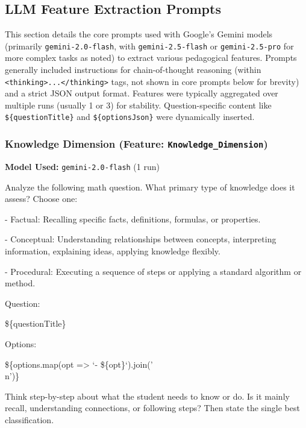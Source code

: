 \documentclass[
    a4paper, %
    10pt, %
    twoside, %
]{LTJournalArticle}
\begin{document}
\subsection{LLM Feature Extraction Prompts}
\label{app:llm_prompts}
This section details the core prompts used with Google's Gemini models (primarily \texttt{gemini-2.0-flash}, with \texttt{gemini-2.5-flash} or \texttt{gemini-2.5-pro} for more complex tasks as noted) to extract various pedagogical features. Prompts generally included instructions for chain-of-thought reasoning (within \texttt{<thinking>...</thinking>} tags, not shown in core prompts below for brevity) and a strict JSON output format. Features were typically aggregated over multiple runs (usually 1 or 3) for stability. Question-specific content like \texttt{\$\{questionTitle\}} and \texttt{\$\{optionsJson\}} were dynamically inserted.

\subsubsection{Knowledge Dimension (Feature: \texttt{Knowledge\_Dimension})}
\label{app:prompt_knowledge_dimension}
\textbf{Model Used:} \texttt{gemini-2.0-flash} (1 run)
\begin{promptbox}
Analyze the following math question. What primary type of knowledge does it assess? Choose one:

\vspace{1em}

- Factual: Recalling specific facts, definitions, formulas, or properties.

- Conceptual: Understanding relationships between concepts, interpreting information, explaining ideas, applying knowledge flexibly.

- Procedural: Executing a sequence of steps or applying a standard algorithm or method.

\vspace{1em}

Question:

\$\{questionTitle\}

\vspace{1em}

Options:

\$\{options.map(opt => `- \$\{opt\}`).join('\\n')\}

\vspace{1em}
Think step-by-step about what the student needs to know or do. Is it mainly recall, understanding connections, or following steps? Then state the single best classification.

\end{promptbox}
\end{document}
